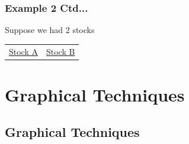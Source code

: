 \documentclass[xcolor=svgnames, compress]{beamer}
\begin{document}

\begin{frame}[t]
\frametitle{Example 2 Ctd...} 


Suppose we had 2 stocks\\

\vspace{+0.25cm}


\begin{tabular}{ C{5cm}  C{5cm} }
\underline{Stock A} &  \underline{Stock B}
\end{tabular}

\begin{figure}[!ht]
\end{figure}

\end{frame}




\section{Graphical Techniques}

\subsection*{Graphical Techniques}


\end{document}
